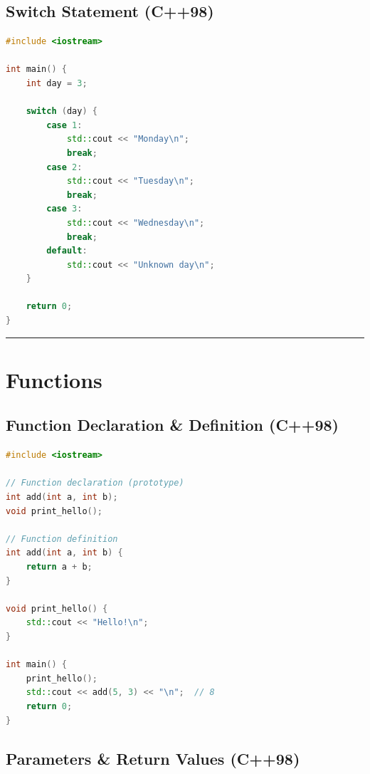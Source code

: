 \hypertarget{switch-statement-c98}{%
\subsection{Switch Statement (C++98)}\label{switch-statement-c98}}

\begin{lstlisting}[language={C++}]
#include <iostream>

int main() {
    int day = 3;
    
    switch (day) {
        case 1:
            std::cout << "Monday\n";
            break;
        case 2:
            std::cout << "Tuesday\n";
            break;
        case 3:
            std::cout << "Wednesday\n";
            break;
        default:
            std::cout << "Unknown day\n";
    }
    
    return 0;
}
\end{lstlisting}

\begin{center}\rule{0.5\linewidth}{0.5pt}\end{center}

\hypertarget{functions}{%
\section{Functions}\label{functions}}

\hypertarget{function-declaration-definition-c98}{%
\subsection{Function Declaration \& Definition
(C++98)}\label{function-declaration-definition-c98}}

\begin{lstlisting}[language={C++}]
#include <iostream>

// Function declaration (prototype)
int add(int a, int b);
void print_hello();

// Function definition
int add(int a, int b) {
    return a + b;
}

void print_hello() {
    std::cout << "Hello!\n";
}

int main() {
    print_hello();
    std::cout << add(5, 3) << "\n";  // 8
    return 0;
}
\end{lstlisting}

\hypertarget{parameters-return-values-c98}{%
\subsection{Parameters \& Return Values
(C++98)}\label{parameters-return-values-c98}}

